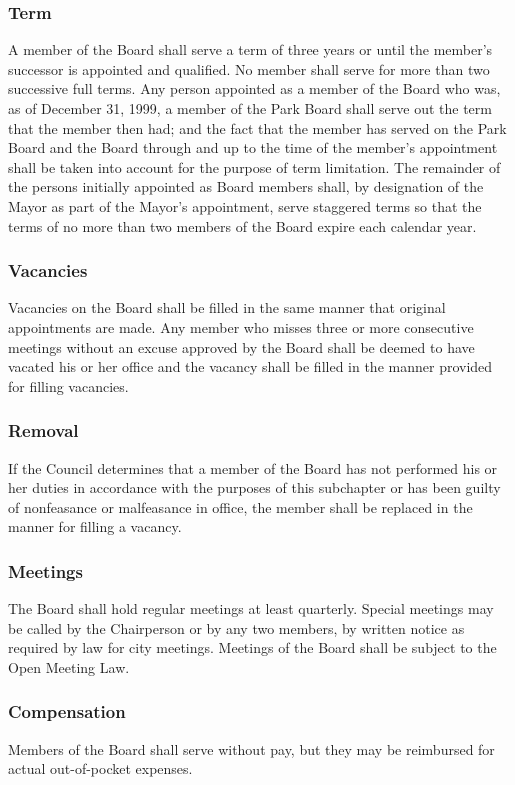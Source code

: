 \subsubsection{Term}
A member of the Board shall serve a term of three years or until the member’s successor is appointed and qualified. No member shall serve for more than two successive full terms.  Any person appointed as a member of the Board who was, as of December 31, 1999, a member of the Park Board shall serve out the term that the member then had; and the fact that the member has served on the Park Board and the Board through and up to the time of the member’s appointment shall be taken into account for the purpose of term limitation. The remainder of the persons initially appointed as Board members shall, by designation of the Mayor as part of the Mayor’s appointment, serve staggered terms so that the terms of no more than two members of the Board expire each calendar year.
\subsubsection{Vacancies}
Vacancies on the Board shall be filled in the same manner that original appointments are made. Any member who misses three or more consecutive meetings without an excuse approved by the Board shall be deemed to have vacated his or her office and the vacancy shall be filled in the manner provided for filling vacancies.
\subsubsection{Removal}
If the Council determines that a member of the Board has not performed his or her duties in accordance with the purposes of this subchapter or has been guilty of nonfeasance or malfeasance in office, the member shall be replaced in the manner for filling a vacancy.
\subsubsection{Meetings}
The Board shall hold regular meetings at least quarterly.  Special meetings may be called by the Chairperson or by any two members, by written notice as required by law for city meetings.  Meetings of the Board shall be subject to the Open Meeting Law.
\subsubsection{Compensation}
Members of the Board shall serve without pay, but they may be reimbursed for actual out-of-pocket expenses.
